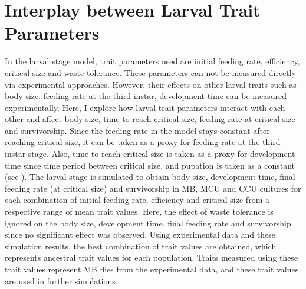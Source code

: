 \chapter{Interplay between Larval Trait Parameters}
In the larval stage model, trait parameters used are initial feeding rate, efficiency, critical size and waste tolerance. These parameters can not be measured directly via experimental approaches. However, their effects on other larval traits such as body size, feeding rate at the third instar, development time can be measured experimentally. Here, I explore how larval trait parameters interact with each other and affect body size, time to reach critical size, feeding rate at critical size and survivorship. Since the feeding rate in the model stays constant after reaching critical size, it can be taken as a proxy for feeding rate at the third instar stage. Also, time to reach critical size is taken as a proxy for development time since time period between critical size, and pupation is taken as a constant (see \citep{santosDensityDependentNaturalSelection1997}). The larval stage is simulated to obtain body size, development time, final feeding rate (at critical size) and survivorship in MB, MCU and CCU cultures for each combination of initial feeding rate, efficiency and critical size from a respective range of mean trait values. Here, the effect of waste tolerance is ignored on the body size, development time, final feeding rate and survivorship since no significant effect was observed. Using experimental data and these simulation results, the best combination of trait values are obtained, which represents ancestral trait values for each population. Traits measured using these trait values represent MB flies from the experimental data, and these trait values are used in further simulations.

